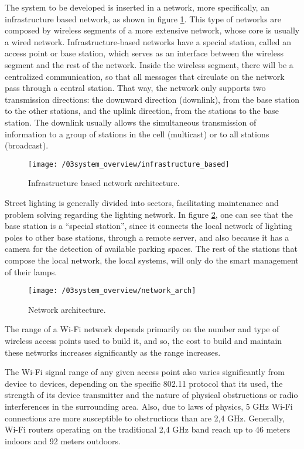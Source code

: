 The system to be developed is inserted in a network, more specifically, an infrastructure based network, as shown in figure \ref{fig:infr_based_arch}. This type of networks are composed by wireless segments of a more extensive network, whose core is usually a wired network. Infrastructure-based networks have a special station, called an access point or base station, which serves as an interface between the wireless segment and the rest of the network. Inside the wireless segment, there will be a centralized communication, so that all messages that circulate on the network pass through a central station. That way, the network only supports two transmission directions: the downward direction (downlink), from the base station to the other stations, and the uplink direction, from the stations to the base station. The downlink usually allows the simultaneous transmission of information to a group of stations in the cell (multicast) or to all stations (broadcast).

\begin{figure}[ht]
	\centering
	\texttt{[image: /03system\_overview/infrastructure\_based]}
	\caption{Infrastructure based network architecture.}
	\label{fig:infr_based_arch}
\end{figure}

Street lighting is generally divided into sectors, facilitating maintenance and problem solving regarding the lighting network. In figure \ref{fig:network_arch}, one can see that the base station is a “special station”, since it connects the local network of lighting poles to other base stations, through a remote server, and also because it has a camera for the detection of available parking spaces. The rest of the stations that compose the local network, the local systems, will only do the smart management of their lamps.

\begin{figure}[ht]
	\centering
	\texttt{[image: /03system\_overview/network\_arch]}
	\caption{Network architecture.}
	\label{fig:network_arch}
\end{figure}

The range of a Wi-Fi network depends primarily on the number and type of wireless access points used to build it, and so, the cost to build and maintain these networks increases significantly as the range increases.

The Wi-Fi signal range of any given access point also varies significantly from device to devices, depending on the specific 802.11 protocol that its used, the strength of its device transmitter and the nature of physical obstructions or radio interferences in the surrounding area. Also, due to laws of physics, 5 GHz Wi-Fi connections are more susceptible to obstructions than are 2,4 GHz. Generally, Wi-Fi routers operating on the traditional 2,4 GHz band reach up to 46 meters indoors and 92 meters outdoors. \cite{wi_fi_range}

